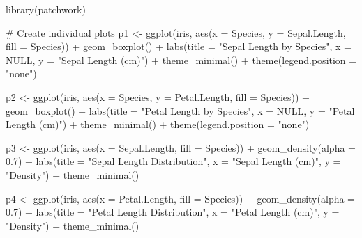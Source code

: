 \documentclass[
  letterpaper,
]{book}
\newenvironment{Shaded}{\begin{snugshade}}{\end{snugshade}}
\newcommand{\AttributeTok}[1]{\textcolor[rgb]{0.40,0.45,0.13}{#1}}
\newcommand{\CommentTok}[1]{\textcolor[rgb]{0.37,0.37,0.37}{#1}}
\newcommand{\ConstantTok}[1]{\textcolor[rgb]{0.56,0.35,0.01}{#1}}
\newcommand{\FloatTok}[1]{\textcolor[rgb]{0.68,0.00,0.00}{#1}}
\newcommand{\FunctionTok}[1]{\textcolor[rgb]{0.28,0.35,0.67}{#1}}
\newcommand{\NormalTok}[1]{\textcolor[rgb]{0.00,0.23,0.31}{#1}}
\newcommand{\OtherTok}[1]{\textcolor[rgb]{0.00,0.23,0.31}{#1}}
\newcommand{\SpecialCharTok}[1]{\textcolor[rgb]{0.37,0.37,0.37}{#1}}
\newcommand{\StringTok}[1]{\textcolor[rgb]{0.13,0.47,0.30}{#1}}
\begin{document}
\begin{Shaded}
\begin{Highlighting}[]
\FunctionTok{library}\NormalTok{(patchwork)}

\CommentTok{\# Create individual plots}
\NormalTok{p1 }\OtherTok{\textless{}{-}} \FunctionTok{ggplot}\NormalTok{(iris, }\FunctionTok{aes}\NormalTok{(}\AttributeTok{x =}\NormalTok{ Species, }\AttributeTok{y =}\NormalTok{ Sepal.Length, }\AttributeTok{fill =}\NormalTok{ Species)) }\SpecialCharTok{+}
  \FunctionTok{geom\_boxplot}\NormalTok{() }\SpecialCharTok{+}
  \FunctionTok{labs}\NormalTok{(}\AttributeTok{title =} \StringTok{"Sepal Length by Species"}\NormalTok{,}
       \AttributeTok{x =} \ConstantTok{NULL}\NormalTok{,}
       \AttributeTok{y =} \StringTok{"Sepal Length (cm)"}\NormalTok{) }\SpecialCharTok{+}
  \FunctionTok{theme\_minimal}\NormalTok{() }\SpecialCharTok{+}
  \FunctionTok{theme}\NormalTok{(}\AttributeTok{legend.position =} \StringTok{"none"}\NormalTok{)}

\NormalTok{p2 }\OtherTok{\textless{}{-}} \FunctionTok{ggplot}\NormalTok{(iris, }\FunctionTok{aes}\NormalTok{(}\AttributeTok{x =}\NormalTok{ Species, }\AttributeTok{y =}\NormalTok{ Petal.Length, }\AttributeTok{fill =}\NormalTok{ Species)) }\SpecialCharTok{+}
  \FunctionTok{geom\_boxplot}\NormalTok{() }\SpecialCharTok{+}
  \FunctionTok{labs}\NormalTok{(}\AttributeTok{title =} \StringTok{"Petal Length by Species"}\NormalTok{,}
       \AttributeTok{x =} \ConstantTok{NULL}\NormalTok{,}
       \AttributeTok{y =} \StringTok{"Petal Length (cm)"}\NormalTok{) }\SpecialCharTok{+}
  \FunctionTok{theme\_minimal}\NormalTok{() }\SpecialCharTok{+}
  \FunctionTok{theme}\NormalTok{(}\AttributeTok{legend.position =} \StringTok{"none"}\NormalTok{)}

\NormalTok{p3 }\OtherTok{\textless{}{-}} \FunctionTok{ggplot}\NormalTok{(iris, }\FunctionTok{aes}\NormalTok{(}\AttributeTok{x =}\NormalTok{ Sepal.Length, }\AttributeTok{fill =}\NormalTok{ Species)) }\SpecialCharTok{+}
  \FunctionTok{geom\_density}\NormalTok{(}\AttributeTok{alpha =} \FloatTok{0.7}\NormalTok{) }\SpecialCharTok{+}
  \FunctionTok{labs}\NormalTok{(}\AttributeTok{title =} \StringTok{"Sepal Length Distribution"}\NormalTok{,}
       \AttributeTok{x =} \StringTok{"Sepal Length (cm)"}\NormalTok{,}
       \AttributeTok{y =} \StringTok{"Density"}\NormalTok{) }\SpecialCharTok{+}
  \FunctionTok{theme\_minimal}\NormalTok{()}

\NormalTok{p4 }\OtherTok{\textless{}{-}} \FunctionTok{ggplot}\NormalTok{(iris, }\FunctionTok{aes}\NormalTok{(}\AttributeTok{x =}\NormalTok{ Petal.Length, }\AttributeTok{fill =}\NormalTok{ Species)) }\SpecialCharTok{+}
  \FunctionTok{geom\_density}\NormalTok{(}\AttributeTok{alpha =} \FloatTok{0.7}\NormalTok{) }\SpecialCharTok{+}
  \FunctionTok{labs}\NormalTok{(}\AttributeTok{title =} \StringTok{"Petal Length Distribution"}\NormalTok{,}
       \AttributeTok{x =} \StringTok{"Petal Length (cm)"}\NormalTok{,}
       \AttributeTok{y =} \StringTok{"Density"}\NormalTok{) }\SpecialCharTok{+}
  \FunctionTok{theme\_minimal}\NormalTok{()}


\end{Highlighting}
\end{Shaded}
\end{document}
